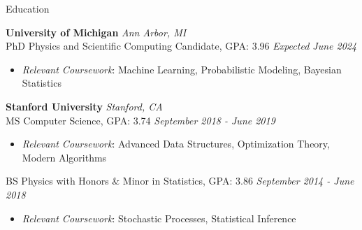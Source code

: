 \documentclass{resume} %
\begin{document}
\begin{rSection}{Education}

{\bf University of Michigan} \hfill {\em Ann Arbor, MI} 
\\ PhD Physics and Scientific Computing Candidate, GPA: 3.96 \hfill {\em Expected June 2024}
\vspace*{-0.1cm}

\begin{itemize}[itemsep=-0.3em] %

    \item 
    \textit{Relevant Coursework}: Machine Learning, Probabilistic Modeling, Bayesian Statistics
\end{itemize}


{\bf Stanford University} \hfill {\em Stanford, CA} 
\\ MS Computer Science, GPA: 3.74 \hfill {\em September 2018 - June 2019}

\begin{itemize}[itemsep=-0.3em] %
\vspace*{-0.1cm}
    \item 
    \textit{Relevant Coursework}: Advanced Data Structures, Optimization Theory, Modern Algorithms
\end{itemize}

BS Physics with Honors \& Minor in Statistics, GPA: 3.86  \hfill {\em September 2014 - June 2018}

\begin{itemize}[itemsep=-0.3em] %
\vspace*{-0.1cm}
    \item 
    \textit{Relevant Coursework}: Stochastic Processes, Statistical Inference
\end{itemize}


\end{rSection}
\end{document}
